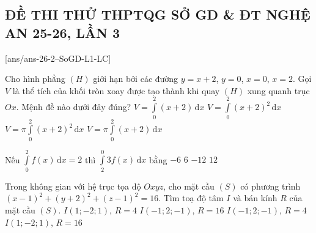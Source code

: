\subsection*{ĐỀ THI THỬ THPTQG SỞ GD \& ĐT NGHỆ AN 25-26, LẦN 3}
\caulc
{}[ans/ans-26-2--SoGD-L1-LC]
\begin{ex}%
	Cho hình phẳng $(H)$ giới hạn bởi các đường $y=x+2$, $y=0$, $x=0$, $x=2$. Gọi $V$ là thể tích của khối tròn xoay được tạo thành khi quay $(H)$ xung quanh trục $Ox$. Mệnh đề nào dưới đây đúng?
	\choice
	{$V=\displaystyle \int \limits_{0}^{2}(x+2)\mathrm{\,d}x$}
	{$V=\displaystyle \int \limits_{0}^{2}(x+2)^{2}\mathrm{\,d}x$}
	{\True $V=\pi\displaystyle \int \limits_{0}^{2}(x+2)^{2}\mathrm{\,d}x$}
	{$V=\pi\displaystyle \int \limits_{0}^{2}(x+2)\mathrm{\,d}x$}
\end{ex}

\begin{ex}%
	Nếu $\displaystyle \int \limits_{0}^{2}f(x)\mathrm{\,d}x=2$ thì $\displaystyle \int \limits_{2}^{0}3f(x)\mathrm{\,d}x$ bằng
	\choice
	{\True $-6$}
	{$6$}
	{$-12$}
	{$12$}
\end{ex}

\begin{ex}%
	Trong không gian với hệ trục tọa độ $Oxyz$, cho mặt cầu $(S)$ có phương trình $(x-1)^{2}+(y+2)^{2}+(z-1)^{2}=16$. Tìm toạ độ tâm $I$ và bán kính $R$ của mặt cầu $(S)$.
	\choice
	{\True $I(1;-2;1)$, $R=4$}
	{$I(-1;2;-1)$, $R=16$}
	{$I(-1;2;-1)$, $R=4$}
	{$I(1;-2;1)$, $R=16$}
\end{ex}


